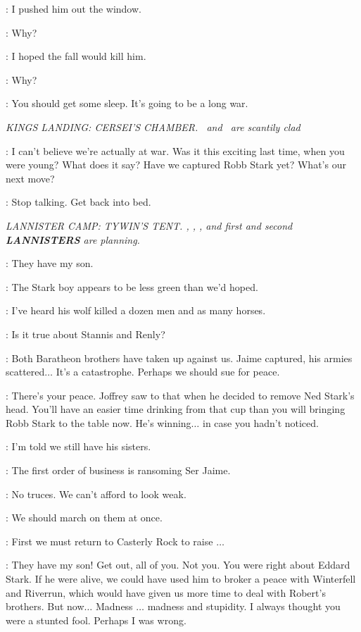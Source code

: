 \JAIME: I pushed him out the window. 

\CATELYN: Why? 

\JAIME: I hoped the fall would kill him. 

\CATELYN: Why? 

\JAIME: You should get some sleep. It's going to be a long war. 


\scene

\textit{KINGS LANDING: CERSEI'S CHAMBER.  \CERSEI ~and \LANCEL ~are scantily clad} 

\LANCEL: I can't believe we're actually at war. Was it this exciting last time, when you were young? What does it say? Have we captured Robb Stark yet? What's our next move? 

\CERSEI: Stop talking. Get back into bed. 


\scene

\textit{LANNISTER CAMP: TYWIN'S TENT. \TYWIN, \KEVAN, \TYRION, and first and second \textbf{LANNISTERS} are planning.} 

\TYWIN: They have my son. 

\TYRION: The Stark boy appears to be less green than we'd hoped. 

\FIRSTLANNISTER: I've heard his wolf killed a dozen men and as many horses. 

\SECONDLANNISTER: Is it true about Stannis and Renly? 

\KEVAN: Both Baratheon brothers have taken up against us. Jaime captured, his armies scattered$\ldots$ It's a catastrophe. Perhaps we should sue for peace. 


\TYRION: There's your peace. Joffrey saw to that when he decided to remove Ned Stark's head. You'll have an easier time drinking from that cup than you will bringing Robb Stark to the table now. He's winning$\ldots$ in case you hadn't noticed. 

\KEVAN: I'm told we still have his sisters. 

\FIRSTLANNISTER: The first order of business is ransoming Ser Jaime. 

\SECONDLANNISTER: No truces. We can't afford to look weak. 

\FIRSTLANNISTER: We should march on them at once. 

\SECONDLANNISTER: First we must return to Casterly Rock to raise $\ldots$  

\TYWIN: They have my son! Get out, all of you.  Not you. You were right about Eddard Stark. If he were alive, we could have used him to broker a peace with Winterfell and Riverrun, which would have given us more time to deal with Robert's brothers. But now$\ldots$ Madness $\ldots$ madness and stupidity. I always thought you were a stunted fool. Perhaps I was wrong. 

